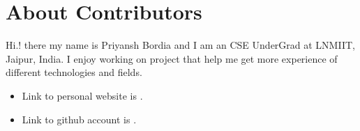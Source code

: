 \documentclass[letterpaper,10pt,english]{sphinxmanual}
\begin{document}
\noindent{}

\noindent{}

\noindent{}

\noindent{}

\noindent{}

\noindent{}

\noindent{}

\noindent{}

\noindent{}


\section{About Contributors}
\label{\detokenize{index:about-contributors}}
Hi.! there my name is Priyansh Bordia and I am an CSE UnderGrad at LNMIIT, Jaipur, India. I enjoy working on project that help me get more experience of different technologies and fields.
\begin{itemize}
\item {} 
Link to personal website is .

\item {} 
Link to github account is .

\end{itemize}



\renewcommand{\indexname}{Index}
\printindex
\end{document}
